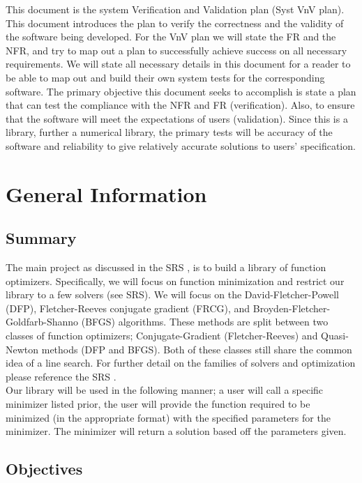 \documentclass[12pt, titlepage]{article}
\begin{document}
This document is the system Verification and Validation plan (Syst VnV plan). This document introduces
the plan to verify the correctness and the validity of the software being developed.  For the VnV plan we
will state the FR and the NFR, and try to map out a plan to successfully achieve success on all necessary 
requirements. We will state all necessary details in this document for a reader to be able to map out and 
build their own system tests for the corresponding software. The primary objective this document seeks to
accomplish is state a plan that can test the compliance with the NFR and FR (verification). Also, to ensure 
that the software will meet the expectations of users (validation). Since this is a library, further a 
numerical library, the primary tests will be accuracy of the software and reliability to give relatively 
accurate solutions to users' specification. 


\section{General Information}

\subsection{Summary}
The main project as discussed in the SRS \citep{SRS}, is to build a library of function optimizers. Specifically, we will
focus on function minimization and restrict our library to a few solvers (see SRS). We will focus on the 
David-Fletcher-Powell (DFP), Fletcher-Reeves conjugate gradient (FRCG), and Broyden-Fletcher-Goldfarb-Shanno (BFGS) algorithms. 
These methods are split between two classes of function optimizers; Conjugate-Gradient (Fletcher-Reeves) and Quasi-Newton 
methods (DFP and BFGS). Both of these classes still share the common idea of a line search. For further detail on the families
of solvers and optimization please reference the SRS \citep{SRS}.
\\

Our library will be used in the following manner; a user will call a specific minimizer listed prior, the user will provide the 
function required to be minimized (in the appropriate format) with the specified parameters for the minimizer. The minimizer will
return a solution based off the parameters given. 

\subsection{Objectives}
\end{document}
